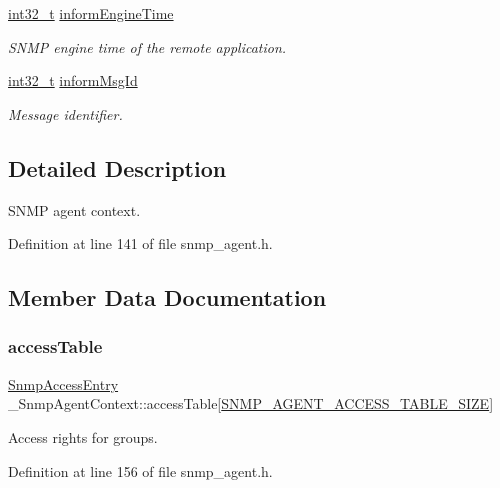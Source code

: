 \begin{DoxyCompactItemize}
\hyperlink{stdint_8h_ab1967d8591af1a4e48c37fd2b0f184d0}{int32\+\_\+t} \hyperlink{struct__SnmpAgentContext_aeba98b72a275158e35dca8f0b46620f1}{inform\+Engine\+Time}
\begin{DoxyCompactList}\small\item\em S\+N\+MP engine time of the remote application. \end{DoxyCompactList}\item 
\hyperlink{stdint_8h_ab1967d8591af1a4e48c37fd2b0f184d0}{int32\+\_\+t} \hyperlink{struct__SnmpAgentContext_adfa2c9d3c5d5dfa33423f7ec429db6ef}{inform\+Msg\+Id}
\begin{DoxyCompactList}\small\item\em Message identifier. \end{DoxyCompactList}\end{DoxyCompactItemize}


\subsection{Detailed Description}
S\+N\+MP agent context. 

Definition at line 141 of file snmp\+\_\+agent.\+h.



\subsection{Member Data Documentation}
\mbox{\label{struct__SnmpAgentContext_a10b237ee97cc0109689597d6d3c0a95e}} 
\subsubsection{\texorpdfstring{access\+Table}{accessTable}}
{\footnotesize\ttfamily \hyperlink{structSnmpAccessEntry}{Snmp\+Access\+Entry} \+\_\+\+Snmp\+Agent\+Context\+::access\+Table\mbox{[}\hyperlink{snmp__agent_8h_a8fbe14dcee7eac378b325a34dd7ea056}{S\+N\+M\+P\+\_\+\+A\+G\+E\+N\+T\+\_\+\+A\+C\+C\+E\+S\+S\+\_\+\+T\+A\+B\+L\+E\+\_\+\+S\+I\+ZE}\mbox{]}}



Access rights for groups. 



Definition at line 156 of file snmp\+\_\+agent.\+h.

